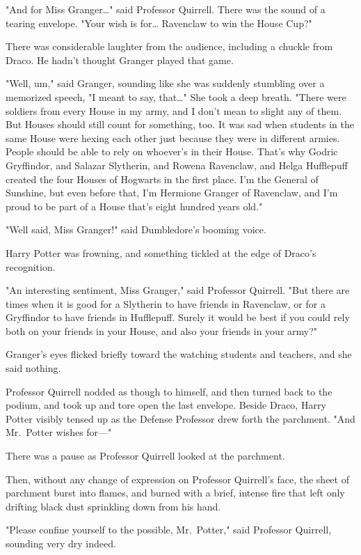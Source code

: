 "And for Miss Granger{\ldots}" said Professor Quirrell. There was the sound of
a tearing envelope. "Your wish is for{\ldots} Ravenclaw to win the House Cup?"

There was considerable laughter from the audience, including a chuckle from
Draco. He hadn't thought Granger played that game.

"Well, um," said Granger, sounding like she was suddenly stumbling over a
memorized speech, "I meant to say, that{\ldots}" She took a deep breath. "There
were soldiers from every House in my army, and I don't mean to slight any of
them. But Houses should still count for something, too. It was sad when
students in the same House were hexing each other just because they were in
different armies. People should be able to rely on whoever's in their House.
That's why Godric Gryffindor, and Salazar Slytherin, and Rowena Ravenclaw, and
Helga Hufflepuff created the four Houses of Hogwarts in the first place. I'm
the General of Sunshine, but even before that, I'm Hermione Granger of
Ravenclaw, and I'm proud to be part of a House that's eight hundred years old."

"Well said, Miss Granger!" said Dumbledore's booming voice.

Harry Potter was frowning, and something tickled at the edge of Draco's
recognition.

"An interesting sentiment, Miss Granger," said Professor Quirrell. "But there
are times when it is good for a Slytherin to have friends in Ravenclaw, or for
a Gryffindor to have friends in Hufflepuff. Surely it would be best if you
could rely both on your friends in your House, and also your friends in your
army?"

Granger's eyes flicked briefly toward the watching students and teachers, and
she said nothing.

Professor Quirrell nodded as though to himself, and then turned back to the
podium, and took up and tore open the last envelope. Beside Draco, Harry Potter
visibly tensed up as the Defense Professor drew forth the parchment. "And
Mr.~Potter wishes for---"

There was a pause as Professor Quirrell looked at the parchment.

Then, without any change of expression on Professor Quirrell's face, the sheet
of parchment burst into flames, and burned with a brief, intense fire that left
only drifting black dust sprinkling down from his hand.

"Please confine yourself to the possible, Mr.~Potter," said Professor Quirrell,
sounding very dry indeed.

